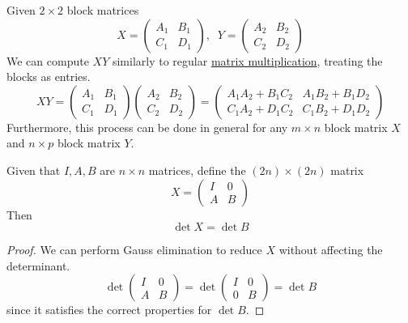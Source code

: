   \begin{theorem}
    \label{thm:arithmetic-of-2times2-block-matrices}
    Given $2 \times 2$ block matrices
    \begin{equation}
      X = \begin{pmatrix}
      A_1&B_1\\C_1&D_1
      \end{pmatrix}, \; \; Y = \begin{pmatrix}
      A_2&B_2\\C_2&D_2
      \end{pmatrix}
    \end{equation}
    We can compute $X Y$ similarly to regular \hyperref[def:matrix-multiplication]{matrix multiplication}, treating the blocks as entries. 
    \begin{equation}
      X Y = \begin{pmatrix}
      A_1&B_1\\C_1&D_1
      \end{pmatrix} \begin{pmatrix}
      A_2&B_2\\C_2&D_2
      \end{pmatrix} = \begin{pmatrix}
      A_1 A_2 + B_1 C_2 & A_1 B_2 + B_1 D_2 \\
      C_1 A_2 + D_1 C_2 & C_1 B_2 + D_1 D_2 
      \end{pmatrix}
    \end{equation}
    Furthermore, this process can be done in general for any $m \times n$ block matrix $X$ and $n \times p$ block matrix $Y$. 
  \end{theorem}

  \begin{theorem}
    \label{thm:determinant-identity-via-a-block-construction}
    Given that $I, A, B$ are $n \times n$ matrices, define the $(2n) \times (2n)$ matrix 
    \begin{equation}
      X = \begin{pmatrix} I & 0 \\ A & B \end{pmatrix}
    \end{equation}
    Then 
    \begin{equation}
      \det{X} = \det{B}
    \end{equation}
  \end{theorem}
  \begin{proof}
    We can perform Gauss elimination to reduce $X$ without affecting the determinant.
    \begin{equation}
      \det{\begin{pmatrix} I&0\\A&B \end{pmatrix}} = \det{ \begin{pmatrix} I&0\\ 0&B \end{pmatrix}} = \det{B}
    \end{equation}
    since it satisfies the correct properties for $\det{B}$. 
  \end{proof}

